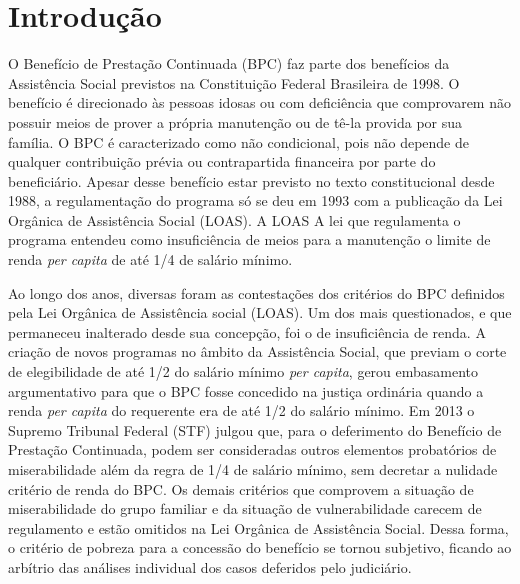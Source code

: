 \documentclass[
	12pt,				%
	openright,			%
	twoside,			%
	a4paper,			%
	english,			%
	french,				%
	spanish,			%
	brazil				%
	]{abntex2}
\begin{document}
\tableofcontents*
\cleardoublepage



\textual

\chapter{Introdução}

O Benefício de Prestação Continuada (BPC) faz parte dos benefícios da Assistência Social previstos na Constituição Federal Brasileira de 1998. O benefício é direcionado às pessoas idosas ou com deficiência que comprovarem não possuir meios de prover a própria manutenção ou de tê-la provida por sua família. O BPC é caracterizado como não condicional, pois não depende de qualquer contribuição prévia ou contrapartida financeira por parte do beneficiário. Apesar desse benefício estar previsto no texto constitucional desde 1988, a regulamentação do programa só se deu em 1993 com a publicação da Lei Orgânica de Assistência Social (LOAS). A LOAS  A lei que regulamenta o programa entendeu como insuficiência de meios para a manutenção o limite de renda \textit{per capita} de até 1/4 de salário mínimo. 

Ao longo dos anos, diversas foram as contestações dos critérios do BPC definidos pela Lei Orgânica de Assistência social (LOAS). Um dos mais questionados, e que permaneceu inalterado desde sua concepção, foi o de insuficiência de renda. A criação de novos programas no âmbito da Assistência Social, que previam o corte de elegibilidade de até 1/2 do salário mínimo \textit{per capita}, gerou embasamento argumentativo para que o BPC fosse concedido na justiça ordinária quando a renda \textit{per capita} do requerente era de até 1/2 do salário mínimo. Em 2013 o Supremo Tribunal Federal (STF) julgou que, para o deferimento do Benefício de Prestação Continuada, podem ser consideradas outros elementos probatórios de miserabilidade além da regra de 1/4 de salário mínimo, sem decretar a nulidade critério de renda do BPC. Os demais critérios que comprovem a situação de miserabilidade do grupo familiar e da situação de vulnerabilidade carecem de regulamento e estão omitidos na Lei Orgânica de Assistência Social. Dessa forma, o critério de pobreza para a concessão do benefício se tornou subjetivo, ficando ao arbítrio das análises individual dos casos deferidos pelo judiciário. 
\end{document}
